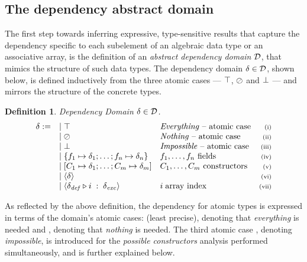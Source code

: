 \documentclass[11pt]{article}
\newtheorem{definition}{Definition}
\newcommand{\snumber}[1]{\textrm{{\scriptsize(#1)}}}
\newcommand{\ver}{\arrowvert \;}
\begin{document}
\subsection{The dependency abstract domain}
\label{sec:depdom}

The first step towards inferring expressive, type-sensitive results that capture
the dependency specific to each subelement of an algebraic data type or an 
associative array, is the definition of an \emph{abstract dependency domain} 
$\mathcal{D}$, that mimics the structure of such data types. The dependency domain $\delta \in 
\mathcal{D}$, shown below, is defined inductively from the three atomic cases --- 
$\top$, $\oslash$ and $\bot$ --- and mirrors the structure of the 
concrete types. 
%
\begin{definition}\label{ch5depdom}{Dependency Domain $\delta \in 
\mathcal{D}$.}
\[
\begin{array}{lllr}
\dom := &\ver \everything &\textrm{\emph{Everything} -- atomic case} &\snumber{i}\\
        &\ver \nothing    &\textrm{\emph{Nothing} -- atomic case} &\snumber{ii}\\
        &\ver \impossible &\textrm{\emph{Impossible} -- atomic case} &\snumber{iii}\\
        &\ver \structdom{\dstruct{1}}{\dstruct{n}} &f_1, \ldots, f_n \textrm{ fields} &\snumber{iv}\\
        &\ver \vardom{\dvar{1}}{\dvar{m}} & C_1, \ldots, C_m  \textrm{ constructors}  &\snumber{v}\\
        &\ver \adom{\dom} & &\snumber{vi}                      \\
        &\ver \addef & i \; \textrm{array index} & \snumber{vii}\\
\end{array}
\]
\end{definition}
%
\noindent As reflected by the above definition, the dependency for atomic types
is expressed in terms of the domain's atomic cases: \everything{} (least
precise), denoting that \emph{everything} is needed and \nothing, denoting that
\emph{nothing} is needed. The third atomic case \impossible, denoting
\emph{impossible}, is introduced for the \emph{possible constructors} analysis
performed simultaneously, and is further explained below.
\end{document}
